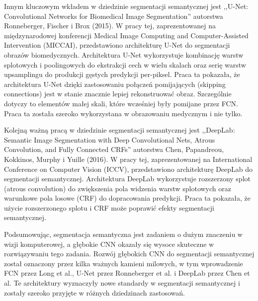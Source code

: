 Innym kluczowym wkładem w dziedzinie segmentacji semantycznej jest ,,U-Net: Convolutional Networks for Biomedical Image Segmentation'' autorstwa Ronneberger, Fischer i Brox (2015)\cite{ronneberger2015u}. W pracy tej, zaprezentowanej na międzynarodowej konferencji Medical Image Computing and Computer-Assisted Intervention (MICCAI), przedstawiono architekturę U-Net do segmentacji obrazów biomedycznych. Architektura U-Net wykorzystuje kombinację warstw splotowych i poolingowych do ekstrakcji cech w wielu skalach oraz serię warstw upsamplingu do produkcji gęstych predykcji per-piksel. Praca ta pokazała, że architektura U-Net dzięki zastosowaniu połączeń pomijających (skipping connections) jest w stanie znacznie lepiej rekonstruować obraz. Szczególnie dotyczy to elementów małej skali, które wcześniej były pomijane przez FCN. Praca ta została szeroko wykorzystana w obrazowaniu medycznym i nie tylko.

Kolejną ważną pracą w dziedzinie segmentacji semantycznej jest ,,DeepLab: Semantic Image Segmentation with Deep Convolutional Nets, Atrous Convolution, and Fully Connected CRFs'' autorstwa Chen, Papandreou, Kokkinos, Murphy i Yuille (2016)\cite{deeplab}. W pracy tej, zaprezentowanej na International Conference on Computer Vision (ICCV), przedstawiono architekturę DeepLab do segmentacji semantycznej. Architektura DeepLab wykorzystuje rozszerzony splot (atrous convolution) do zwiększenia pola widzenia warstw splotowych oraz warunkowe pola losowe (CRF) do dopracowania predykcji. Praca ta pokazała, że użycie rozszerzonego splotu i CRF może poprawić efekty segmentacji semantycznej.

Podsumowując, segmentacja semantyczna jest zadaniem o dużym znaczeniu w wizji komputerowej, a głębokie CNN okazały się wysoce skuteczne w rozwiązywaniu tego zadania. Rozwój głębokich CNN do segmentacji semantycznej został oznaczony przez kilka ważnych kamieni milowych, w tym wprowadzenie FCN przez Long et al., U-Net przez Ronneberger et al. i DeepLab przez Chen et al. Te architektury wyznaczyły nowe standardy w segmentacji semantycznej i zostały szeroko przyjęte w różnych dziedzinach zastosowań.




